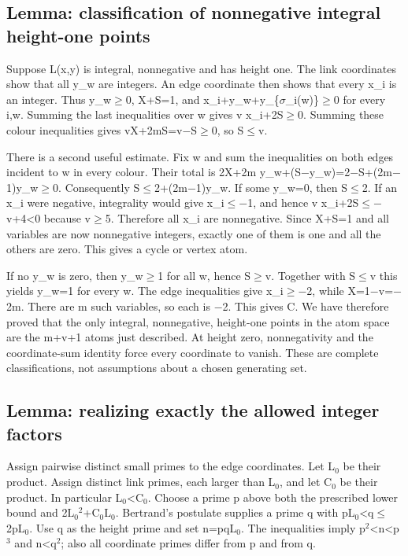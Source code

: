 \documentclass[11pt,a4paper]{article}
\begin{document}
\subsection{Lemma: classification of nonnegative integral height-one points}
Suppose L(x,y) is integral, nonnegative and has height one. The link coordinates show that all y\_w are integers. An edge coordinate then shows that every x\_i is an integer. Thus y\_w\ensuremath{\geq}0, X+S=1, and x\_i+y\_w+y\_\{\ensuremath{\sigma}\_i(w)\}\ensuremath{\geq}0 for every i,w. Summing the last inequalities over w gives v x\_i+2S\ensuremath{\geq}0. Summing these colour inequalities gives vX+2mS=v\ensuremath{-}S\ensuremath{\geq}0, so S\ensuremath{\leq}v.

There is a second useful estimate. Fix w and sum the inequalities on both edges incident to w in every colour. Their total is 2X+2m y\_w+(S\ensuremath{-}y\_w)=2\ensuremath{-}S+(2m\ensuremath{-}1)y\_w\ensuremath{\geq}0. Consequently S\ensuremath{\leq}2+(2m\ensuremath{-}1)y\_w. If some y\_w=0, then S\ensuremath{\leq}2. If an x\_i were negative, integrality would give x\_i\ensuremath{\leq}\ensuremath{-}1, and hence v x\_i+2S\ensuremath{\leq}\ensuremath{-}v+4<0 because v\ensuremath{\geq}5. Therefore all x\_i are nonnegative. Since X+S=1 and all variables are now nonnegative integers, exactly one of them is one and all the others are zero. This gives a cycle or vertex atom.

If no y\_w is zero, then y\_w\ensuremath{\geq}1 for all w, hence S\ensuremath{\geq}v. Together with S\ensuremath{\leq}v this yields y\_w=1 for every w. The edge inequalities give x\_i\ensuremath{\geq}\ensuremath{-}2, while X=1\ensuremath{-}v=\ensuremath{-}2m. There are m such variables, so each is \ensuremath{-}2. This gives C. We have therefore proved that the only integral, nonnegative, height-one points in the atom space are the m+v+1 atoms just described. At height zero, nonnegativity and the coordinate-sum identity force every coordinate to vanish. These are complete classifications, not assumptions about a chosen generating set.

\subsection{Lemma: realizing exactly the allowed integer factors}
Assign pairwise distinct small primes to the edge coordinates. Let L\ensuremath{_0} be their product. Assign distinct link primes, each larger than L\ensuremath{_0}, and let C\ensuremath{_0} be their product. In particular L\ensuremath{_0}<C\ensuremath{_0}. Choose a prime p above both the prescribed lower bound and 2L\ensuremath{_0}\ensuremath{^2}+C\ensuremath{_0}L\ensuremath{_0}. Bertrand's postulate supplies a prime q with pL\ensuremath{_0}<q\ensuremath{\leq}2pL\ensuremath{_0}. Use q as the height prime and set n=pqL\ensuremath{_0}. The inequalities imply p\ensuremath{^2}<n<p\ensuremath{^3} and n<q\ensuremath{^2}; also all coordinate primes differ from p and from q.
\end{document}
